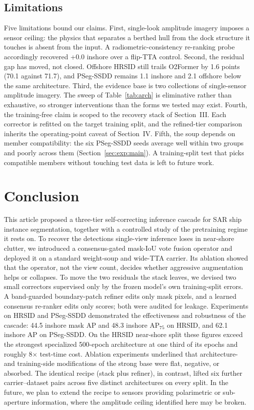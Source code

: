 \subsection{Limitations}
\label{sec:disc-limitations}

Five limitations bound our claims. First, single-look amplitude imagery imposes a sensor ceiling: the physics that separates a berthed hull from the dock structure it touches is absent from the input. A radiometric-consistency re-ranking probe accordingly recovered +0.0 inshore over a flip-TTA control. Second, the residual gap has moved, not closed. Offshore HRSID still trails O2Former by 1.6 points (70.1 against 71.7), and PSeg-SSDD remains 1.1 inshore and 2.1 offshore below the same architecture. Third, the evidence base is two collections of single-sensor amplitude imagery. The sweep of Table~\ref{tab:arch} is eliminative rather than exhaustive, so stronger interventions than the forms we tested may exist. Fourth, the training-free claim is scoped to the recovery stack of Section~III. Each corrector is refitted on the target training split, and the refined-tier comparison inherits the operating-point caveat of Section~IV. Fifth, the soup depends on member compatibility: the six PSeg-SSDD seeds average well within two groups and poorly across them (Section~\ref{sec:exp:main}). A training-split test that picks compatible members without touching test data is left to future work.

\section{Conclusion}
\label{sec:conclusion}

This article proposed a three-tier self-correcting inference cascade for SAR ship instance segmentation, together with a controlled study of the pretraining regime it rests on. To recover the detections single-view inference loses in near-shore clutter, we introduced a consensus-gated mask-IoU vote fusion operator and deployed it on a standard weight-soup and wide-TTA carrier. Its ablation showed that the operator, not the view count, decides whether aggressive augmentation helps or collapses. To move the two residuals the stack leaves, we devised two small correctors supervised only by the frozen model's own training-split errors. A band-guarded boundary-patch refiner edits only mask pixels, and a learned consensus re-ranker edits only scores; both were audited for leakage. Experiments on HRSID and PSeg-SSDD demonstrated the effectiveness and robustness of the cascade: 44.5 inshore mask AP and 48.3 inshore AP$_{75}$ on HRSID, and 62.1 inshore AP on PSeg-SSDD. On the HRSID near-shore split these figures exceed the strongest specialized 500-epoch architecture at one third of its epochs and roughly 8$\times$ test-time cost. Ablation experiments underlined that architecture- and training-side modifications of the strong base were flat, negative, or absorbed. The identical recipe (stack plus refiner), in contrast, lifted six further carrier--dataset pairs across five distinct architectures on every split. In the future, we plan to extend the recipe to sensors providing polarimetric or sub-aperture information, where the amplitude ceiling identified here may be broken.

